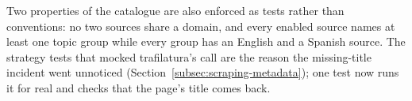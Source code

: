 Two properties of the catalogue are also enforced as tests rather than
conventions: no two sources share a domain, and every enabled source
names at least one topic group while every group has an English and a
Spanish source. The strategy tests that mocked trafilatura's call are
the reason the missing-title incident went unnoticed
(Section~\ref{subsec:scraping-metadata}); one test now runs it for
real and checks that the page's title comes back.
